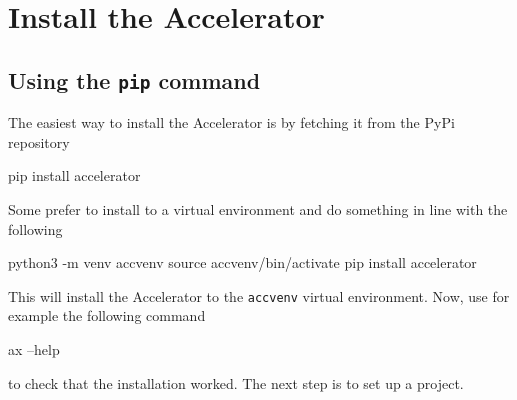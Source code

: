 
\section{Install the Accelerator}

\subsection{Using the \texttt{pip} command}
The easiest way to install the Accelerator is by fetching it from the
PyPi repository
\begin{shell}
pip install accelerator
\end{shell}
Some prefer to install to a virtual environment and do something in
line with the following
\begin{shell}
python3 -m venv accvenv
source accvenv/bin/activate
pip install accelerator
\end{shell}
This will install the Accelerator to the \texttt{accvenv} virtual
environment.  Now, use for example the following command
\begin{shell}
ax --help
\end{shell}
to check that the installation worked.  The next step is to set up a
project.




